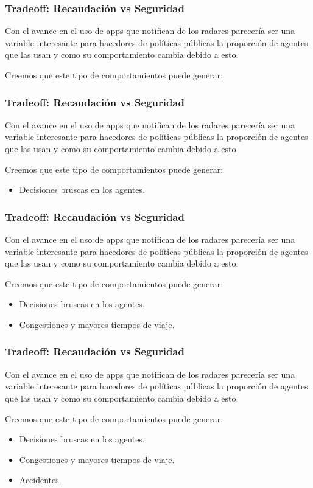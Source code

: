 \documentclass[10pt, compress]{beamer}
\begin{document}
\begin{frame}[fragile]
\frametitle{Tradeoff: Recaudaci\'on vs Seguridad}
Con el avance en el uso de apps que notifican de los radares parecer\'ia ser una variable interesante para hacedores de pol\'iticas p\'ublicas la proporci\'on de agentes que las usan y como su comportamiento cambia debido a esto.

Creemos que este tipo de comportamientos puede generar:
\addtocounter{framenumber}{-1}
\end{frame}

\begin{frame}[fragile]
\frametitle{Tradeoff: Recaudaci\'on vs Seguridad}
Con el avance en el uso de apps que notifican de los radares parecer\'ia ser una variable interesante para hacedores de pol\'iticas p\'ublicas la proporci\'on de agentes que las usan y como su comportamiento cambia debido a esto.

Creemos que este tipo de comportamientos puede generar:

\begin{itemize}
\item Decisiones bruscas en los agentes.
\end{itemize}
\addtocounter{framenumber}{-1}
\end{frame}

\begin{frame}[fragile]
\frametitle{Tradeoff: Recaudaci\'on vs Seguridad}
Con el avance en el uso de apps que notifican de los radares parecer\'ia ser una variable interesante para hacedores de pol\'iticas p\'ublicas la proporci\'on de agentes que las usan y como su comportamiento cambia debido a esto.

Creemos que este tipo de comportamientos puede generar:

\begin{itemize}
\item Decisiones bruscas en los agentes.
\item Congestiones y mayores tiempos de viaje.
\end{itemize}
\addtocounter{framenumber}{-1}
\end{frame}

\begin{frame}[fragile]
\frametitle{Tradeoff: Recaudaci\'on vs Seguridad}
Con el avance en el uso de apps que notifican de los radares parecer\'ia ser una variable interesante para hacedores de pol\'iticas p\'ublicas la proporci\'on de agentes que las usan y como su comportamiento cambia debido a esto.

Creemos que este tipo de comportamientos puede generar:

\begin{itemize}
\item Decisiones bruscas en los agentes.
\item Congestiones y mayores tiempos de viaje.
\item Accidentes.
\end{itemize}
\addtocounter{framenumber}{-1}
\end{frame}
\end{document}
